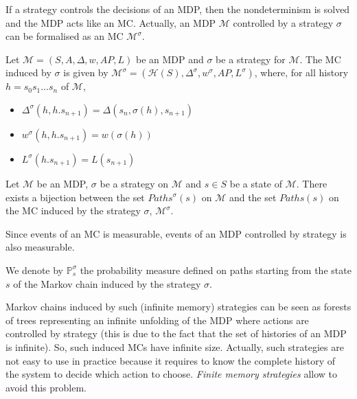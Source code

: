 If a strategy controls the decisions of an MDP, then the nondeterminism is solved
and the MDP acts like an MC. Actually, an MDP $\mathcal{M}$ controlled by a strategy $\sigma$ can be formalised as an MC $\mathcal{M}^\sigma$.

\begin{definition}
Let $\mathcal{M} = (S, A, \Delta, w, AP, L)$ be an MDP and $\sigma$ be a strategy for
$\mathcal{M}$. The MC induced by $\sigma$ is given by
$ \mathcal{M}^\sigma = (\mathcal{H}(S), \Delta^\sigma, w^\sigma, AP, L^\sigma) $, where, for all history
$h = s_0 s_1 \dots s_n$ of $\mathcal{M}$,
\begin{itemize}
\item $\Delta^\sigma(h, h . s_{n+1}) = \Delta(s_n, \sigma(h), s_{n+1})$
\item $w^\sigma(h, h . s_{n+1}) = w(\sigma(h))$
\item $L^\sigma(h . s_{n+1}) = L(s_{n+1})$
\end{itemize}
\end{definition}

\begin{property}
  Let $\mathcal{M}$ be an MDP, $\sigma$ be a strategy on $\mathcal{M}$ and $s\in S$ be a state of $\mathcal{M}$. There exists a bijection between the
  set $Paths^\sigma(s)$ on $\mathcal{M}$ and the set $Paths(s)$ on the MC induced by the strategy $\sigma$, $\mathcal{M}^\sigma$.
\end{property}

Since events of an MC is measurable, events of an MDP controlled by strategy is also measurable.
\begin{notation}
  We denote by $\mathbb{P}_s^\sigma$ the probability measure defined on paths starting from the state $s$ of the Markov chain induced by the strategy $\sigma$.
\end{notation}

Markov chains induced by such (infinite memory) strategies can be seen as forests of trees representing an infinite unfolding of the MDP where actions are controlled by strategy (this is due to the fact that the set of histories of an MDP is infinite). So, such induced MCs have infinite size. Actually, such strategies are not easy to use in practice because it requires to
know the complete history of the system to decide which action to choose. \textit{Finite memory strategies} allow to avoid this problem.

